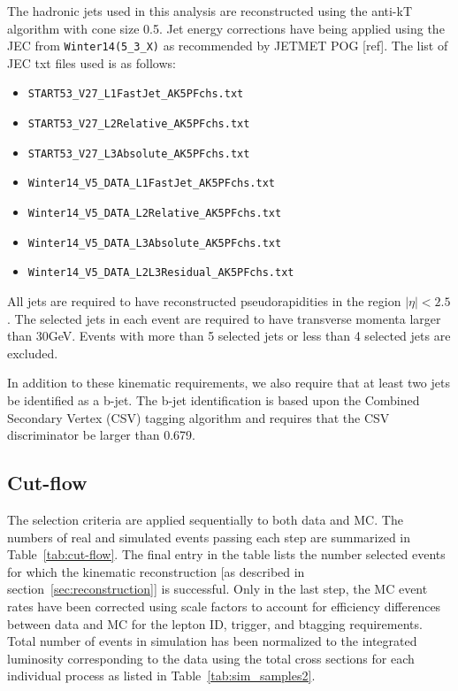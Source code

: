 \documentclass{cmspaperpdf}
\begin{document}
The hadronic jets used in this analysis are reconstructed using the anti-kT algorithm with cone size 0.5. Jet energy corrections have being applied using the JEC from \texttt{Winter14(5\_3\_X)} as recommended by JETMET POG [ref]. The list of JEC txt files used is as follows:
\begin{itemize}
\item \texttt{START53\_V27\_L1FastJet\_AK5PFchs.txt}
\item \texttt{START53\_V27\_L2Relative\_AK5PFchs.txt}
\item \texttt{START53\_V27\_L3Absolute\_AK5PFchs.txt}
\item \texttt{Winter14\_V5\_DATA\_L1FastJet\_AK5PFchs.txt}
\item \texttt{Winter14\_V5\_DATA\_L2Relative\_AK5PFchs.txt}
\item \texttt{Winter14\_V5\_DATA\_L3Absolute\_AK5PFchs.txt}
\item \texttt{Winter14\_V5\_DATA\_L2L3Residual\_AK5PFchs.txt}
\end{itemize}  

All jets are required to have reconstructed pseudorapidities in the region $|\eta|<2.5$.  The selected jets in each event are required to have transverse momenta larger than 30GeV. Events with more than 5 selected jets or less than 4 selected jets are excluded. 

In addition to these kinematic requirements, we also require that at least two jets be identified as a b-jet.  The b-jet identification is based upon the Combined Secondary Vertex (CSV) tagging algorithm \cite{CSV_note} and requires that the CSV discriminator be larger than 0.679.

\subsection{Cut-flow}

The selection criteria are applied sequentially to both data and MC.  The numbers of real and simulated events passing each step are summarized in Table~\ref{tab:cut-flow}.  The final entry in the table lists the number selected events for which the kinematic reconstruction [as described in section~\ref{sec:reconstruction}] is successful. Only in the last step, the MC event rates have been corrected using scale factors to account for efficiency differences between data and MC for the lepton ID, trigger, and btagging requirements. Total number of events in simulation has been normalized to the integrated luminosity corresponding to the data using the total cross sections for each individual process as listed in Table~\ref{tab:sim_samples2}. 
\end{document}
